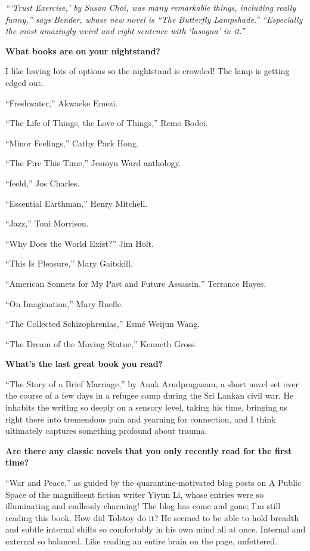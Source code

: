 \emph{```Trust Exercise,' by Susan Choi, was many remarkable things,
including really funny,'' says Bender, whose new novel is ``The
Butterfly Lampshade.'' ``Especially the most amazingly weird and right
sentence with `lasagna' in it.''}

\textbf{What books are on your nightstand?}

I like having lots of options so the nightstand is crowded! The lamp is
getting edged out.

``Freshwater,'' Akwaeke Emezi.

``The Life of Things, the Love of Things,'' Remo Bodei.

``Minor Feelings,'' Cathy Park Hong.

``The Fire This Time,'' Jesmyn Ward anthology.

``feeld,'' Jos Charles.

``Essential Earthman,'' Henry Mitchell.

``Jazz,'' Toni Morrison.

``Why Does the World Exist?'' Jim Holt.

``This Is Pleasure,'' Mary Gaitskill.

``American Sonnets for My Past and Future Assassin,'' Terrance Hayes.

``On Imagination,'' Mary Ruefle.

``The Collected Schizophrenias,'' Esmé Weijun Wang.

``The Dream of the Moving Statue,'' Kenneth Gross.

\textbf{What's the last great book you read?}

``The Story of a Brief Marriage,'' by Anuk Arudpragasam, a short novel
set over the course of a few days in a refugee camp during the Sri
Lankan civil war. He inhabits the writing so deeply on a sensory level,
taking his time, bringing us right there into tremendous pain and
yearning for connection, and I think ultimately captures something
profound about trauma.

\textbf{Are there any classic novels that you only recently read for the
first time?}

``War and Peace,'' as guided by the quarantine-motivated blog posts on A
Public Space of the magnificent fiction writer Yiyun Li, whose entries
were so illuminating and endlessly charming! The blog has come and gone;
I'm still reading this book. How did Tolstoy do it? He seemed to be able
to hold breadth and subtle internal shifts so comfortably in his own
mind all at once. Internal and external so balanced. Like reading an
entire brain on the page, unfettered.

